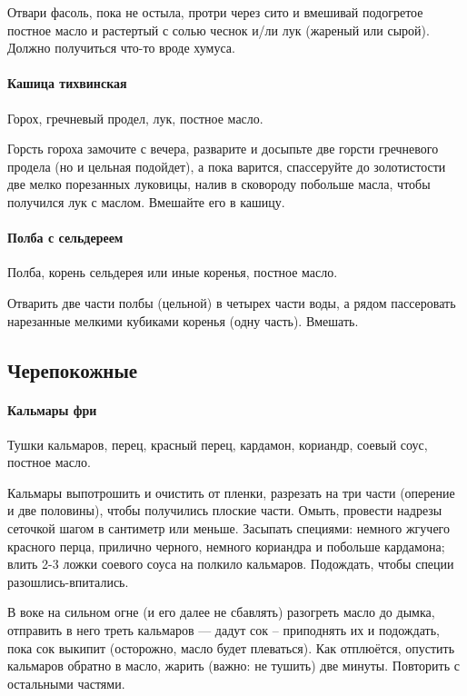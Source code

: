 \documentclass[11pt,a5paper]{article}
\begin{document}
Отвари фасоль, пока не остыла, протри через сито и вмешивай подогретое постное масло и растертый с солью чеснок и/ли лук (жареный или сырой). Должно получиться что-то вроде хумуса.

\paragraph{Кашица тихвинская} %

Горох, гречневый продел, лук, постное масло.

Горсть гороха замочите с вечера, разварите и досыпьте две горсти гречневого продела (но и цельная подойдет), а пока варится, спассеруйте до золотистости две мелко порезанных луковицы, налив в сковороду побольше масла, чтобы получился лук с маслом. Вмешайте его в кашицу.

\paragraph{Полба с сельдереем} %

Полба, корень сельдерея или иные коренья, постное масло.

Отварить две части полбы (цельной) в четырех части воды, а рядом пассеровать нарезанные мелкими кубиками коренья (одну часть). Вмешать.


\subsection{Черепокожные}
\paragraph{Кальмары фри} %

Тушки кальмаров, перец, красный перец, кардамон, кориандр, соевый соус, постное масло.

Кальмары выпотрошить и очистить от пленки, разрезать на три части (оперение и две половины), чтобы получились плоские части. Омыть, провести надрезы сеточкой шагом в сантиметр или меньше. Засыпать специями: немного жгучего красного перца, прилично черного, немного кориандра и побольше кардамона; влить 2-3 ложки соевого соуса на полкило кальмаров. Подождать, чтобы специи разошлись-впитались.

В воке на сильном огне (и его далее не сбавлять) разогреть масло до дымка, отправить в него треть кальмаров --- дадут сок -- приподнять их и подождать, пока сок выкипит (осторожно, масло будет плеваться). Как отплюётся, опустить кальмаров обратно в масло, жарить (важно: не тушить) две минуты. Повторить с остальными частями.
\end{document}
